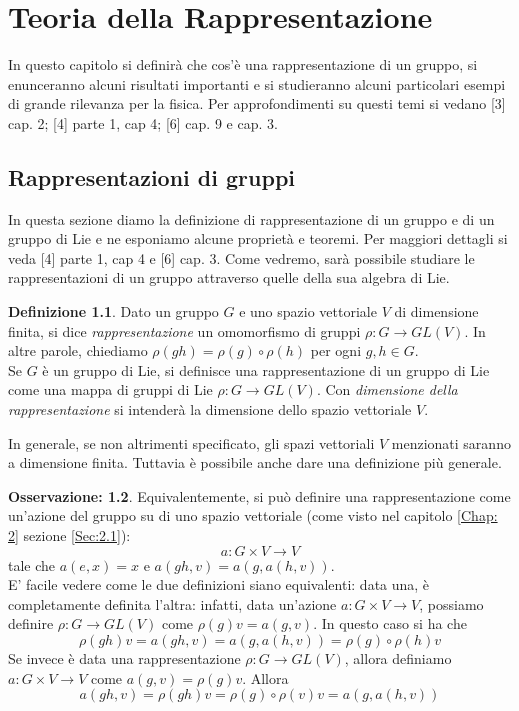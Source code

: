 \documentclass[12pt,a4paper]{report}
\theoremstyle{definition}
\newtheorem{Def}{Definizione}[chapter]
\theoremstyle{Theorem}
\theoremstyle{definition}
\theoremstyle{definition}
\theoremstyle{definition}
\newtheorem{Obs}[Def]{Osservazione:}
\begin{document}
\chapter{Teoria della Rappresentazione}
\label{chap:3}
In questo capitolo si definirà che cos'è una rappresentazione di un gruppo, si enunceranno alcuni risultati importanti e si studieranno alcuni particolari esempi di grande rilevanza per la fisica.
Per approfondimenti su questi temi si vedano [3] cap. 2; [4] parte 1, cap 4; [6] cap. 9 e cap. 3.
\section{Rappresentazioni di gruppi}
In questa sezione diamo la definizione di rappresentazione di un gruppo e di un gruppo di Lie e ne esponiamo alcune proprietà e teoremi. Per maggiori dettagli si veda [4] parte 1, cap 4 e [6] cap. 3.
Come vedremo, sarà possibile studiare le rappresentazioni di un gruppo attraverso quelle della sua algebra di Lie.
\begin{Def}
Dato un gruppo $G$ e uno spazio vettoriale $V$ di dimensione finita, si dice \textit{rappresentazione} un omomorfismo di gruppi $\rho:G\rightarrow GL(V)$. In altre parole, chiediamo $\rho(gh)=\rho(g)\circ\rho(h)$ per ogni $g,h\in G$.\\
Se $G$ è un gruppo di Lie, si definisce una rappresentazione di un gruppo di Lie come una mappa di gruppi di Lie $\rho:G\rightarrow GL(V)$. Con \textit{dimensione della rappresentazione} si intenderà la dimensione dello spazio vettoriale $V$.
\end{Def}
In generale, se non altrimenti specificato, gli spazi vettoriali $V$ menzionati saranno a dimensione finita. Tuttavia è possibile anche dare una definizione più generale.
\begin{Obs}
	Equivalentemente, si può definire una rappresentazione come un'azione del gruppo su di uno spazio vettoriale (come visto nel capitolo \ref{Chap: 2} sezione \ref{Sec:2.1}):
	$$a:G\times V\rightarrow V$$
	tale che $a(e,x)=x$ e $a(gh,v)=a(g,a(h,v))$.\\
	E' facile vedere come le due definizioni siano equivalenti: data una, è completamente definita l'altra: infatti, data un'azione $a:G\times V\rightarrow V$, possiamo definire $\rho:G\rightarrow GL(V)$ come $\rho(g)v=a(g,v)$. In questo caso si ha che $$\rho(gh)v=a(gh,v)=a(g,a(h,v))=\rho(g)\circ\rho(h)v$$
		Se invece è data una rappresentazione $\rho:G\rightarrow GL(V)$, allora definiamo $a:G\times V\rightarrow V$ come $a(g,v)=\rho(g)v$. Allora $$a(gh,v)=\rho(gh)v=\rho(g)\circ\rho(v)v=a(g,a(h,v))$$
\end{Obs}
\end{document}
